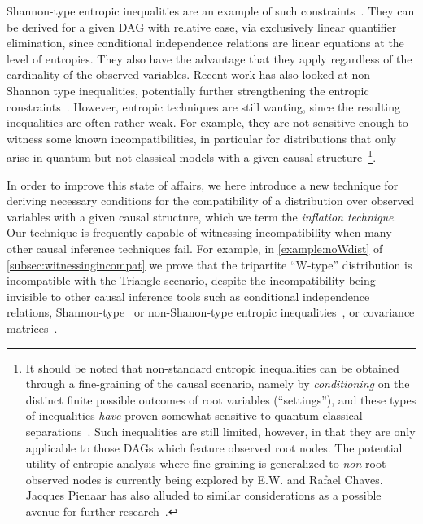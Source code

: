 \documentclass[aps,english,superscriptaddress,onecolumn,twoside,longbibliography,pra,floatfix,fleqn,nofootinbib]{revtex4-1}%
\theoremstyle{definition}
\newcounter{example}[section]
\begin{document}
Shannon-type entropic inequalities are an example of such constraints~\cite{steudel2010ancestors,fritz2012bell,fritz2013marginal,chaves2014novel,chaves2014informationinference}. They can be derived for a given DAG with relative ease, via exclusively linear quantifier elimination, since conditional independence relations are linear equations at the level of entropies. They also have the advantage that they apply regardless of the cardinality of the observed variables. Recent work has also looked at non-Shannon type inequalities, potentially further strengthening the entropic constraints~\cite{weilenmann2016entropic,pianaar2016interesting}. However, entropic techniques are still wanting, since the resulting inequalities are often rather weak. For example, they are not sensitive enough to witness some known incompatibilities, in particular for distributions that only arise in quantum but not classical models with a given causal structure~\cite{fritz2012bell,weilenmann2016entropic}\footnote{It should be noted that non-standard entropic inequalities can be obtained through a fine-graining of the causal scenario, namely by \emph{conditioning} on the distinct finite possible outcomes of root variables (``settings''), and these types of inequalities \emph{have} proven somewhat sensitive to quantum-classical separations~\cite{braunstein1988entropic,SchumacherInequality,chaves2014novel}. Such inequalities are still limited, however, in that they are only applicable to those DAGs which feature observed root nodes. The potential utility of entropic analysis where fine-graining is generalized to \emph{non}-root observed nodes is currently being explored by E.W. and Rafael Chaves. Jacques Pienaar has also alluded to similar considerations as a possible avenue for further research~\cite{pianaar2016interesting}.}.

In order to improve this state of affairs, we here introduce a new technique for deriving necessary conditions for the compatibility of a distribution over observed variables with a given causal structure, which we term the {\em inflation technique}. Our technique is frequently capable of witnessing incompatibility when many other causal inference techniques fail. For example, in \cref{example:noWdist} of \cref{subsec:witnessingincompat} we prove that the tripartite ``W-type'' distribution is incompatible with the Triangle scenario, despite the incompatibility being invisible to other causal inference tools such as conditional independence relations, Shannon-type~\cite{fritz2013marginal,chaves2014novel,chaves2014informationinference} or non-Shanon-type entropic inequalities~\cite{weilenmann2016entropic}, or covariance matrices~\cite{kela2016covariance}.
\end{document}
